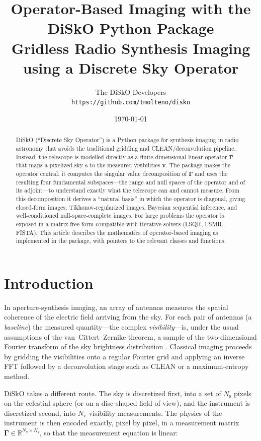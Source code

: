 \documentclass[11pt,a4paper]{article}
\title{Operator-Based Imaging with the DiSkO Python Package\\
\large Gridless Radio Synthesis Imaging using a Discrete Sky Operator}
\author{The DiSkO Developers\\[2mm]
\small \texttt{https://github.com/tmolteno/disko}}
\date{\today}
\newcommand{\R}{\mathbb{R}}
\newcommand{\Ns}{N_{\mathrm{s}}}
\newcommand{\Nv}{N_{\mathrm{v}}}
\newcommand{\Gammam}{\boldsymbol{\Gamma}}
\newcommand{\svec}{\boldsymbol{s}}
\newcommand{\vvec}{\boldsymbol{v}}
\begin{document}
\maketitle

\begin{abstract}
DiSkO (``Discrete Sky Operator'') is a Python package for synthesis imaging in
radio astronomy that avoids the traditional gridding and CLEAN/deconvolution
pipeline. Instead, the telescope is modelled directly as a finite-dimensional
linear operator $\Gammam$ that maps a pixelized sky $\svec$ to the measured
visibilities $\vvec$. The package makes the operator central: it computes the
singular value decomposition of $\Gammam$ and uses the resulting four
fundamental subspaces---the range and null spaces of the operator and of its
adjoint---to understand exactly what the telescope can and cannot measure. From
this decomposition it derives a ``natural basis'' in which the operator is
diagonal, giving closed-form images, Tikhonov-regularized images, Bayesian
sequential inference, and well-conditioned null-space-complete images. For
large problems the operator is exposed in a matrix-free form compatible with
iterative solvers (LSQR, LSMR, FISTA). This article describes the mathematics
of operator-based imaging as implemented in the package, with pointers to the
relevant classes and functions.
\end{abstract}

\section{Introduction}

In aperture-synthesis imaging, an array of antennas measures the spatial
coherence of the electric field arriving from the sky. For each pair of
antennas (a \emph{baseline}) the measured quantity---the complex
\emph{visibility}---is, under the usual assumptions of the van~Cittert--Zernike
theorem, a sample of the two-dimensional Fourier transform of the sky
brightness distribution \cite{thompson2017,perley1989}. Classical imaging
proceeds by gridding the visibilities onto a regular Fourier grid and applying
an inverse FFT followed by a deconvolution stage such as CLEAN or a
maximum-entropy method.

DiSkO takes a different route. The sky is discretized first, into a set of
$\Ns$ pixels on the celestial sphere (or on a disc-shaped field of view), and
the instrument is discretized second, into $\Nv$ visibility measurements. The
physics of the instrument is then encoded exactly, pixel by pixel, in a
measurement matrix $\Gammam\in\R^{\Nv\times\Ns}$, so that the measurement
equation is linear:
\end{document}
